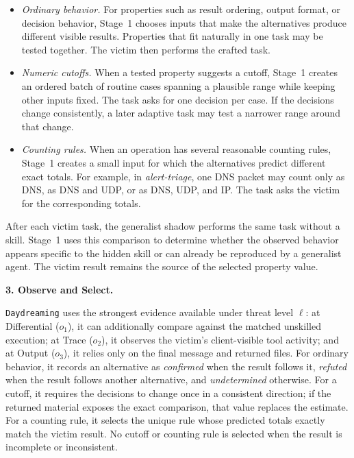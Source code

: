 \documentclass[letterpaper,twocolumn,10pt]{article}
\newcommand{\method}{\texttt{Daydreaming}\xspace}
\newcommand{\paragraphtitle}[1]{%
  \vspace{5pt}\noindent\textbf{#1.}%
}
\begin{document}
\begin{itemize}
    \item \emph{Ordinary behavior.}
    For properties such as result ordering, output format, or decision behavior, Stage~1 chooses inputs that make the alternatives produce different visible results. Properties that fit naturally in one task may be tested together. The victim then performs the crafted task.

    \item \emph{Numeric cutoffs.}
    When a tested property suggests a cutoff, Stage~1 creates an ordered batch of routine cases spanning a plausible range while keeping other inputs fixed. The task asks for one decision per case. If the decisions change consistently, a later adaptive task may test a narrower range around that change.

    \item \emph{Counting rules.}
    When an operation has several reasonable counting rules, Stage~1 creates a small input for which the alternatives predict different exact totals. For example, in \textit{alert-triage}, one DNS packet may count only as DNS, as DNS and UDP, or as DNS, UDP, and IP. The task asks the victim for the corresponding totals.
\end{itemize}

After each victim task, the generalist shadow performs the same task without a skill. Stage~1 uses this comparison to determine whether the observed behavior appears specific to the hidden skill or can already be reproduced by a generalist agent. The victim result remains the source of the selected property value.

\paragraphtitle{3. Observe and Select}
\method uses the strongest evidence available under threat level $\ell$: at Differential ($o_1$), it can additionally compare against the matched unskilled execution; at Trace ($o_2$), it observes the victim’s client-visible tool activity; and at Output ($o_3$), it relies only on the final message and returned files.
For ordinary behavior, it records an alternative as \emph{confirmed} when the result follows it, \emph{refuted} when the result follows another alternative, and \emph{undetermined} otherwise. For a cutoff, it requires the decisions to change once in a consistent direction; if the returned material exposes the exact comparison, that value replaces the estimate. For a counting rule, it selects the unique rule whose predicted totals exactly match the victim result. No cutoff or counting rule is selected when the result is incomplete or inconsistent.
\end{document}
